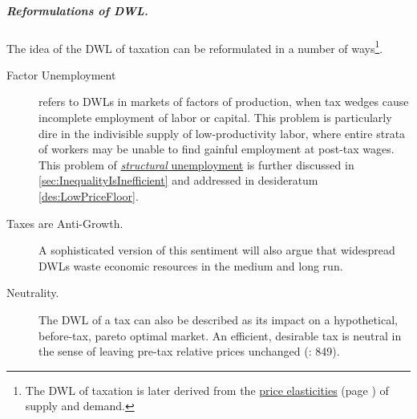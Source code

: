 \subparagraph{Reformulations of DWL.} The idea of the DWL of taxation can be reformulated in a number of ways\footnote{The DWL of taxation is later derived from the \hyperref[sec:TaxInelastic]{price elasticities} (page \pageref{sec:TaxInelastic}) of supply and demand.}.
\begin{description}
	\item[Factor Unemployment] refers to DWLs in markets of factors of production, when tax wedges cause incomplete employment of labor or capital. This problem is particularly dire in the indivisible supply of low-productivity labor, where entire strata of workers may be unable to find gainful employment at post-tax wages. This problem of \hyperref[sec:StructuralUnemployment]{\emph{structural} unemployment} is further discussed in \autoref{sec:InequalityIsInefficient} and addressed in desideratum \ref{des:LowPriceFloor}. 
	\item[Taxes are Anti-Growth.] A sophisticated version of this sentiment will also argue that widespread DWLs waste economic resources in the medium and long run.
	\item[Neutrality.] The DWL of a tax can also be described as its impact on a hypothetical, before-tax, pareto optimal market. An efficient, desirable tax is neutral in the sense of leaving pre-tax relative prices unchanged (\citealt{McCaffery2005}: 849). 
\end{description}




